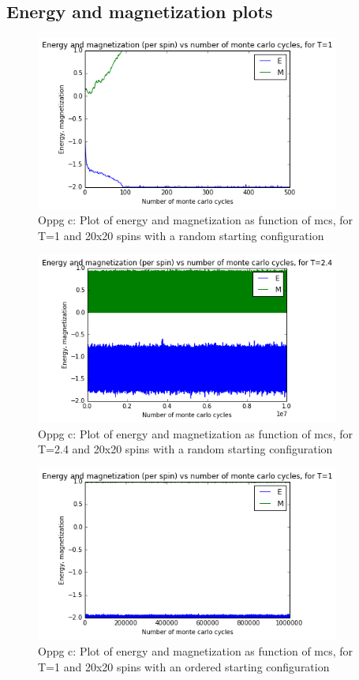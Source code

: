 \documentclass[twocolumn]{article}
\begin{document}
\centering\subsection{Energy and magnetization plots}

\newpage

\newpage

\begin{figure}[h!]
  \centering
  \caption{Oppg c: Plot of energy and magnetization as function of mcs, for T=1 and 20x20 spins with a random starting configuration}
  \includegraphics[width=10cm]{E_M_plot_c_1.png}
\end{figure}

\begin{figure}[h!]
  \centering
  \caption{Oppg c: Plot of energy and magnetization as function of mcs, for T=2.4 and 20x20 spins with a random starting configuration}
  \includegraphics[width=10cm]{E_M_plot_c_2.png}
\end{figure}

\begin{figure}[h!]
  \centering
  \caption{Oppg c: Plot of energy and magnetization as function of mcs, for T=1 and 20x20 spins with an ordered starting configuration}
  \includegraphics[width=10cm]{E_M_plot_c_3.png}
\end{figure}
\end{document}
